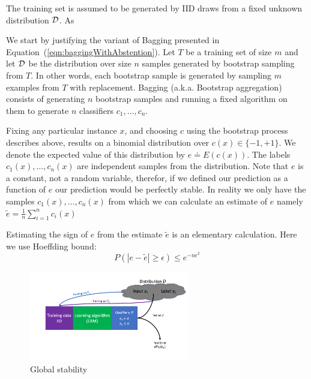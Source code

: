 \documentclass{article}
\begin{document}
The training set is assumed to be generated by IID draws from a fixed
unknown distribution ${\cal D}$.  As 


We start by justifying the variant of Bagging presented in
Equation~(\ref{eqn:baggingWithAbstention}). Let $T$ be a training set
of size $m$ and let ${\cal D}$ be the distribution over size $n$ samples
generated by bootstrap sampling from $T$. In other words, each
bootstrap sample is generated by sampling $m$ examples from $T$ with
replacement. Bagging (a.k.a. Bootstrap aggregation) consists of
generating $n$ bootstrap samples and running a fixed algorithm on them
to generate $n$ classifiers $c_1,\ldots,c_n$.

\newcommand{\te}{\tilde{e}}

Fixing any particular instance $x$, and choosing $c$ using the
bootstrap process describes above, results on a binomial distribution
over $c(x) \in \{-1,+1\}$. We denote the expected value of this distribution
by $e \doteq E\left( c(x) \right)$. The labels
$c_1(x),\ldots,c_n(x)$ are independent samples from the distribution.
Note that $e$ is a constant, not a random variable, therefor, if we
defined our prediction as a function of $e$ our prediction would be
perfectly stable. In reality we only
have the samples $c_1(x),\ldots,c_n(x)$ from which we can calculate
an estimate of $e$ namely $\te = \frac{1}{n} \sum_{i=1}^n c_i(x)$

Estimating the sign of $e$ from the estimate $\te$ is an
elementary calculation. Here we use Hoeffding bound:
\begin{equation}
  P\left( |e -\te| \geq \epsilon \right)
  \leq e^{-n \epsilon^2}
\end{equation}
\fi



\iffalse
\begin{figure}[h]
\begin{center}
\includegraphics[width=2.75in]{PPTFigures/Uniform-Bound.png}
\end{center}
\caption{Global stability}
\label{fig:rationale}
\end{figure}
\end{document}
